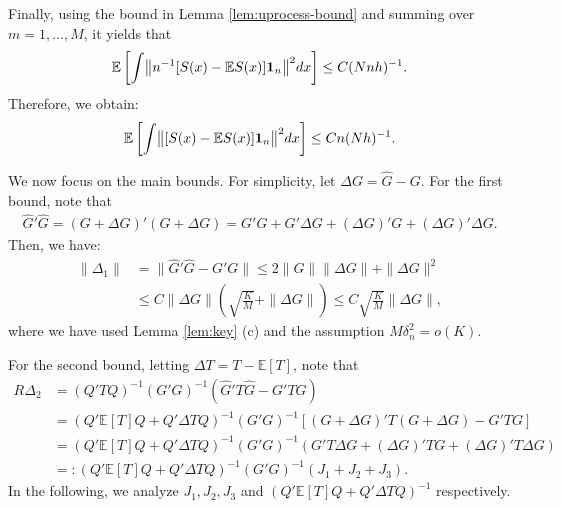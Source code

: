 \documentclass[preprint,11pt]{article}
\newcommand{\mbb}{\mathbb}
\numberwithin{equation}{section}
\begin{document}
Finally, using the bound in Lemma \ref{lem:uprocess-bound} and summing over $m=1,\ldots,M$, it yields that
\begin{align*}
    \mbb{E}\left[\int \bigl\|n^{-1}[S(x)-\mathbb{E}S(x)]{\bf 1}_n\bigr\|^2dx\right]\le C(Nnh)^{-1}.
\end{align*}
Therefore, we obtain:
\begin{align*}
    \mbb{E}\left[\int \bigl\|[S(x)-\mathbb{E}S(x)]{\bf 1}_n\bigr\|^2dx\right]\le Cn(Nh)^{-1}.
\end{align*}

We now focus on the main bounds. For simplicity, let $\Delta G=\widehat{G}-G$. For the first bound, note that
\begin{align*}
    \widehat{G}'\widehat{G}=(G+\Delta G)'(G+\Delta G)=G'G+G'\Delta G+(\Delta G)'G+(\Delta G)'\Delta G.
\end{align*}
Then, we have:
\begin{align*}
    \|\Delta_1\|&=\|\widehat{G}'\widehat{G}-G'G\|\le 2\|G\|\|\Delta G\|+\|\Delta G\|^2\\
    &\le C\|\Delta G\|\left(\sqrt{\frac{K}{M}}+\|\Delta G\|\right)\le C\sqrt{\frac{K}{M}}\|\Delta G\|,
\end{align*}
where we have used Lemma \ref{lem:key} (c) and the assumption $M\delta_n^2=o(K)$.

For the second bound, letting $\Delta T=T-\mbb{E}[T]$, note that
\begin{align*}
    R\Delta_2&=(Q'TQ)^{-1}(G'G)^{-1}(\widehat{G}'T\widehat{G}-G'TG)\\
    &=(Q'\mbb{E}[T]Q+Q'\Delta T Q)^{-1}(G'G)^{-1}\left[(G+\Delta G)'T(G+\Delta G)-G'TG\right]\\
    &=(Q'\mbb{E}[T]Q+Q'\Delta T Q)^{-1}(G'G)^{-1}(G'T\Delta G+(\Delta G)'TG+(\Delta G)'T\Delta G)\\
    &=:(Q'\mbb{E}[T]Q+Q'\Delta T Q)^{-1}(G'G)^{-1}(J_1+J_2+J_3).
\end{align*}
In the following, we analyze $J_1,J_2,J_3$ and $(Q'\mbb{E}[T]Q+Q'\Delta T Q)^{-1}$ respectively.
\end{document}
